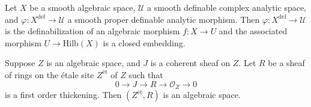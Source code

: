 \documentclass[
	fontsize=10pt, %
]{kaohandt}
\newcommand{\definable}{\mathrm{def}}
\begin{document}
\begin{proposition}
    Let $X$ be a smooth algebraic space,
    $\mathcal{U}$ a smooth definable complex analytic space,
    and $\varphi: X^{\definable} \to \mathcal{U}$ a smooth proper definable analytic morphism.
    Then $\varphi: X^{\definable} \to \mathcal{U}$ is the definabilization of an algebraic morphism $f: X \to U$ and 
    the associated morphism $U \to \mathrm{Hilb}(X)$ is a closed embedding.
\end{proposition}

\begin{lemma}
    Suppose $Z$ is an algebraic space,
    and $J$ is a coherent sheaf on $Z$.
    Let $R$ be a sheaf of rings on the {\'e}tale site $Z^{\text{\' et}}$ of $Z$ such that 
    \[
    0 \to J \to R \to \mathcal{O}_Z \to 0
    \]
    is a first order thickening.
    Then $(Z^{\text{\'et}},R)$ is an algebraic space.
\end{lemma}

\appendix %





\printbibliography[title=Bibliography] %
\end{document}
